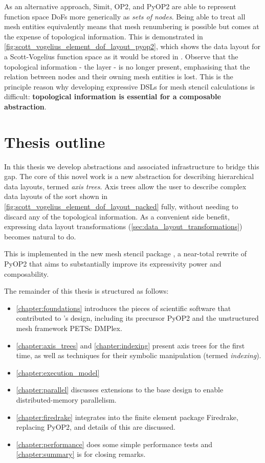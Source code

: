 \documentclass[thesis]{subfiles}
\begin{document}
As an alternative approach, Simit, OP2, and PyOP2 are able to represent function space DoFs more generically as \textit{sets of nodes}.
Being able to treat all mesh entities equivalently means that mesh renumbering is possible but comes at the expense of topological information.
This is demonstrated in \cref{fig:scott_vogelius_element_dof_layout_pyop2}, which shows the data layout for a Scott-Vogelius function space as it would be stored in .
Observe that the topological information - the  layer - is no longer present, emphasising that the relation between nodes and their owning mesh entities is lost.
This is the principle reason why developing expressive DSLs for mesh stencil calculations is difficult: \textbf{topological information is essential for a composable abstraction}.

\section{Thesis outline}

In this thesis we develop abstractions and associated infrastructure to bridge this gap.
The core of this novel work is a new abstraction for describing hierarchical data layouts, termed \textit{axis trees}.
Axis trees allow the user to describe complex data layouts of the sort shown in \cref{fig:scott_vogelius_element_dof_layout_packed} fully, without needing to discard any of the topological information.
As a convenient side benefit, expressing data layout transformations (\cref{sec:data_layout_transformations}) becomes natural to do.

This is implemented in the new mesh stencil package , a near-total rewrite of PyOP2 that aims to substantially improve its expressivity power and composability.

The remainder of this thesis is structured as follows:


\begin{itemize}
  \item
    \cref{chapter:foundations} introduces the pieces of scientific software that contributed to 's design, including its precursor PyOP2 and the unstructured mesh framework PETSc DMPlex.
  \item
    \cref{chapter:axis_trees} and \cref{chapter:indexing} present axis trees for the first time, as well as techniques for their symbolic manipulation (termed \textit{indexing}).
  \item
    \cref{chapter:execution_model} 
  \item
    \cref{chapter:parallel} discusses extensions to the base design to enable distributed-memory parallelism.
  \item
    \cref{chapter:firedrake} integrates  into the finite element package Firedrake, replacing PyOP2, and details of this are discussed.
  \item
    \cref{chapter:performance} does some simple performance tests and \cref{chapter:summary} is for closing remarks.
\end{itemize}
\end{document}
